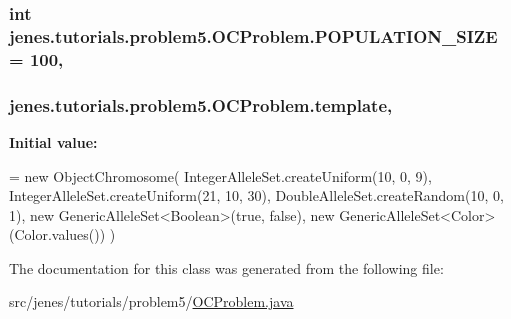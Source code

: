 \hypertarget{classjenes_1_1tutorials_1_1problem5_1_1_o_c_problem_a6f83b4fb8527ded39ad6dd116e7677e7}{
\subsubsection[{P\-O\-P\-U\-L\-A\-T\-I\-O\-N\-\_\-\-S\-I\-Z\-E}]{\setlength{\rightskip}{0pt plus 5cm}int jenes.\-tutorials.\-problem5.\-O\-C\-Problem.\-P\-O\-P\-U\-L\-A\-T\-I\-O\-N\-\_\-\-S\-I\-Z\-E = 100\hspace{0.3cm}{\ttfamily [static]}, {\ttfamily [private]}}}\label{classjenes_1_1tutorials_1_1problem5_1_1_o_c_problem_a6f83b4fb8527ded39ad6dd116e7677e7}
\hypertarget{classjenes_1_1tutorials_1_1problem5_1_1_o_c_problem_a0a60e116ef66b31e038f3c29ba23188a}{
\subsubsection[{template}]{ jenes.\-tutorials.\-problem5.\-O\-C\-Problem.\-template\hspace{0.3cm}{\ttfamily [static]}, {\ttfamily [private]}}}\label{classjenes_1_1tutorials_1_1problem5_1_1_o_c_problem_a0a60e116ef66b31e038f3c29ba23188a}
{\bfseries Initial value\-:}
\begin{DoxyCode}
=
            \textcolor{keyword}{new} ObjectChromosome( IntegerAlleleSet.createUniform(10, 0, 9),
            IntegerAlleleSet.createUniform(21, 10, 30),
            DoubleAlleleSet.createRandom(10, 0, 1),
            \textcolor{keyword}{new} GenericAlleleSet<Boolean>(\textcolor{keyword}{true}, \textcolor{keyword}{false}),
            \textcolor{keyword}{new} GenericAlleleSet<Color>(Color.values()) )
\end{DoxyCode}


The documentation for this class was generated from the following file\-:\begin{DoxyCompactItemize}
\item 
src/jenes/tutorials/problem5/\hyperlink{problem5_2_o_c_problem_8java}{O\-C\-Problem.\-java}\end{DoxyCompactItemize}
